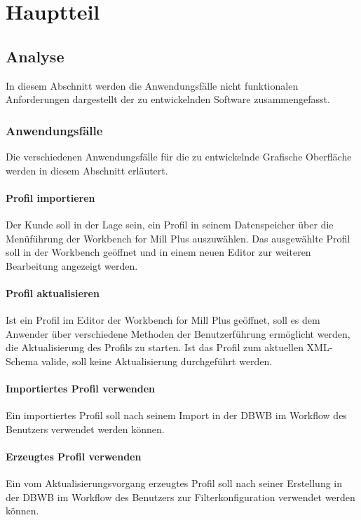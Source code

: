 
\chapter{Hauptteil}
\label{cha:Hauptteil}

\section{Analyse}{
\label{sec:analyse}
In diesem Abschnitt werden die Anwendungsfälle nicht funktionalen Anforderungen dargestellt der zu entwickelnden Software zusammengefasst.
\subsection{Anwendungsfälle}{
Die verschiedenen Anwendungsfälle für die zu entwickelnde Grafische Oberfläche werden in diesem Abschnitt erläutert.

\subsubsection{Profil importieren}{
Der Kunde soll in der Lage sein, ein Profil in seinem Datenspeicher über die Menüführung der Workbench for Mill Plus auszuwählen. Das ausgewählte Profil soll in der Workbench geöffnet und in einem neuen Editor zur weiteren Bearbeitung angezeigt werden.
}

\subsubsection{Profil aktualisieren}{
Ist ein Profil im Editor der Workbench for Mill Plus geöffnet, soll es dem Anwender über verschiedene Methoden der Benutzerführung ermöglicht werden, die Aktualisierung des Profils zu starten. Ist das Profil zum aktuellen XML-Schema valide, soll keine Aktualisierung durchgeführt werden.
}

\subsubsection{Importiertes Profil verwenden}{
Ein importiertes Profil soll nach seinem Import in der \ac{DBWB} im Workflow des Benutzers  verwendet werden können. 
}

\subsubsection{Erzeugtes Profil verwenden}{
Ein vom Aktualisierungsvorgang erzeugtes Profil soll nach seiner Erstellung in der \ac{DBWB} im Workflow des Benutzers zur Filterkonfiguration verwendet werden können. 
}



}}
